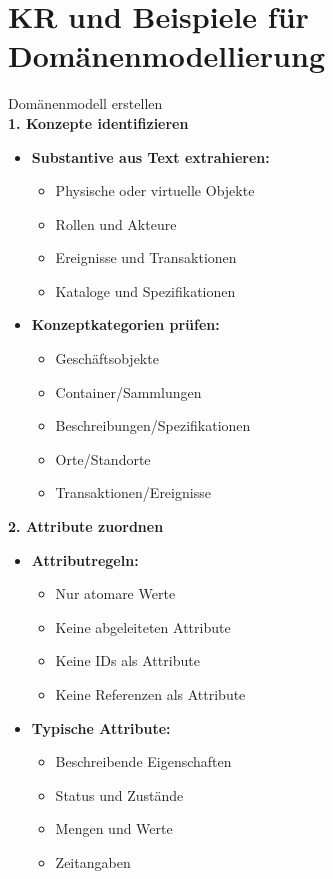 \section{KR und Beispiele für Domänenmodellierung}

\begin{KR}{Domänenmodell erstellen}\\
\textbf{1. Konzepte identifizieren}
\begin{itemize}
    \item \textbf{Substantive aus Text extrahieren:}
    \begin{itemize}
        \item Physische oder virtuelle Objekte
        \item Rollen und Akteure
        \item Ereignisse und Transaktionen
        \item Kataloge und Spezifikationen
    \end{itemize}
    
    \item \textbf{Konzeptkategorien prüfen:}
    \begin{itemize}
        \item Geschäftsobjekte
        \item Container/Sammlungen
        \item Beschreibungen/Spezifikationen
        \item Orte/Standorte
        \item Transaktionen/Ereignisse
    \end{itemize}
\end{itemize}

\textbf{2. Attribute zuordnen}
\begin{itemize}
    \item \textbf{Attributregeln:}
    \begin{itemize}
        \item Nur atomare Werte
        \item Keine abgeleiteten Attribute
        \item Keine IDs als Attribute
        \item Keine Referenzen als Attribute
    \end{itemize}
    
    \item \textbf{Typische Attribute:}
    \begin{itemize}
        \item Beschreibende Eigenschaften
        \item Status und Zustände
        \item Mengen und Werte
        \item Zeitangaben
    \end{itemize}
\end{itemize}


\end{KR}
